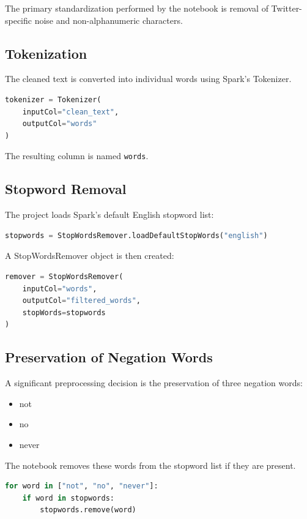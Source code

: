 \documentclass[12pt,a4paper]{article}
\begin{document}
The primary standardization performed by the notebook is removal of Twitter-specific noise and non-alphanumeric characters.

\subsection{Tokenization}

The cleaned text is converted into individual words using Spark's Tokenizer.

\begin{lstlisting}[language=Python]
tokenizer = Tokenizer(
    inputCol="clean_text",
    outputCol="words"
)
\end{lstlisting}

The resulting column is named \texttt{words}.

\subsection{Stopword Removal}

The project loads Spark's default English stopword list:

\begin{lstlisting}[language=Python]
stopwords = StopWordsRemover.loadDefaultStopWords("english")
\end{lstlisting}

A StopWordsRemover object is then created:

\begin{lstlisting}[language=Python]
remover = StopWordsRemover(
    inputCol="words",
    outputCol="filtered_words",
    stopWords=stopwords
)
\end{lstlisting}

\subsection{Preservation of Negation Words}

A significant preprocessing decision is the preservation of three negation words:

\begin{itemize}
    \item not
    \item no
    \item never
\end{itemize}

The notebook removes these words from the stopword list if they are present.

\begin{lstlisting}[language=Python]
for word in ["not", "no", "never"]:
    if word in stopwords:
        stopwords.remove(word)
\end{lstlisting}
\end{document}
